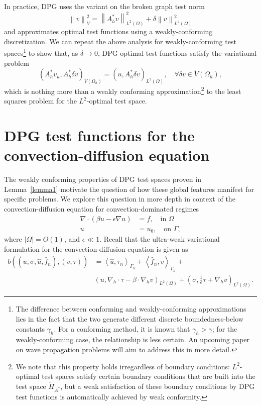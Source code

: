\documentclass[11pt,onecolumn]{scrartcl}
\newcommand{\nor}[1]{\left\| #1 \right\|}
\newcommand{\LRp}[1]{\left( #1 \right)}
\newcommand{\LRa}[1]{\left\langle #1 \right\rangle}
\newcommand{\LRb}[1]{\left| #1 \right|}
\newcommand{\Grad} {\ensuremath{\nabla}}
\newcommand{\uh}{\widehat{u}}
\newcommand{\fnh}{\widehat{f}_n}
\renewcommand{\L}{L^2\LRp{\Omega}}
\newcommand{\Gh}{\Gamma_h}
\newcommand{\Oh}{\Omega_h}
\newcommand{\grad}{\nabla}
\renewcommand{\div}{\grad \cdot}
\begin{document}
In practice, DPG uses the variant on the broken graph test norm
\[
\nor{v}_{V}^2 = \nor{A_h^*v}_{\L}^2 + \delta \nor{v}_{\L}^2
\]
and approximates optimal test functions using a weakly-conforming discretization.  We can repeat the above analysis for weakly-conforming test spaces\footnote{The difference between conforming and weakly-conforming approximations lies in the fact that the two generate different discrete boundedness-below constants $\gamma_h$.  For a conforming method, it is known that $\gamma_h > \gamma$; for the weakly-conforming case, the relationship is less certain.  An upcoming paper on wave propagation problems will aim to address this in more detail.} to show that, as $\delta \rightarrow 0$, DPG optimal test functions satisfy the variational problem
\[
\LRp{A_h^* v_u, A_h^* \delta v}_{V(\Omega_h)} = \LRp{u,A_h^* \delta v}_{L^2(\Omega)}, \quad \forall \delta v \in \tilde{V}(\Oh),
\]
which is nothing more than a weakly conforming approximation\footnote{We note that this property holds irregardless of boundary conditions: $L^2$-optimal test spaces satisfy certain boundary conditions that are built into the test space $\tilde{H}_{A^*}$, but a weak satisfaction of these boundary conditions by DPG test functions is automatically achieved by weak conformity.} to the least squares problem for the $L^2$-optimal test space.


\section{DPG test functions for the convection-diffusion equation}

The weakly conforming properties of DPG test spaces proven in Lemma~\ref{lemma1} motivate the question of how these global features manifest for specific problems.  We explore this question in more depth in context of the convection-diffusion equation for convection-dominated regimes
\begin{align*}
\div\LRp{\beta u - \epsilon \grad u} &= f, \quad \text{in } \Omega \\
u &= u_{0}, \quad \text{on } \Gamma, 
\end{align*}
where $\LRb{\Omega} = O(1)$, and $\epsilon \ll 1$.  Recall that the ultra-weak variational formulation for the convection-diffusion equation is given as
\begin{align*}
b\LRp{\LRp{u,\sigma, \uh, \fnh}, \LRp{v,\tau}} &= \LRa{\uh,\tau_n}_{\Gh} + \LRa{\fnh,v}_{\Gh}+ \\ & \LRp{u, \Grad_h\cdot \tau - \beta\cdot \Grad_h v}_{L^2\LRp{\Omega}} + \LRp{\sigma, \frac{1}{\epsilon}\tau + \Grad_h v}_{L^2\LRp{\Omega}}.
\end{align*}
\end{document}
